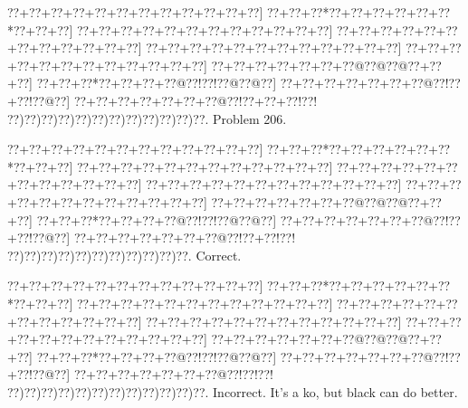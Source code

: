 \documentclass[a5paper]{article}
\begin{document}
\newpage
\begin{center}
{\goo
\0??+\0??+\0??+\0??+\0??+\0??+\0??+\0??+\0??+\0??+\0??+\0??]
\0??+\0??+\0??*\0??+\0??+\0??+\0??+\0??+\0??*\0??+\0??+\0??]
\0??+\0??+\0??+\0??+\0??+\0??+\0??+\0??+\0??+\0??+\0??+\0??]
\0??+\0??+\0??+\0??+\0??+\0??+\0??+\0??+\0??+\0??+\0??+\0??]
\0??+\0??+\0??+\0??+\0??+\0??+\0??+\0??+\0??+\0??+\0??+\0??]
\0??+\0??+\0??+\0??+\0??+\0??+\0??+\0??+\0??+\0??+\0??+\0??]
\0??+\0??+\0??+\0??+\0??+\0??+\0??@\0??@\0??@\0??+\0??+\0??]
\0??+\0??+\0??*\0??+\0??+\0??+\0??@\0??!\0??!\0??@\0??@\0??]
\0??+\0??+\0??+\0??+\0??+\0??+\0??@\0??!\0??+\0??!\0??@\0??]
\0??+\0??+\0??+\0??+\0??+\0??+\0??@\0??!\0??+\0??+\0??!\0??!
\0??)\0??)\0??)\0??)\0??)\0??)\0??)\0??)\0??)\0??)\0??)\0??.
}
Problem 206.

\end{center}
\begin{center}
{\goo
\0??+\0??+\0??+\0??+\0??+\0??+\0??+\0??+\0??+\0??+\0??+\0??]
\0??+\0??+\0??*\0??+\0??+\0??+\0??+\0??+\0??*\0??+\0??+\0??]
\0??+\0??+\0??+\0??+\0??+\0??+\0??+\0??+\0??+\0??+\0??+\0??]
\0??+\0??+\0??+\0??+\0??+\0??+\0??+\0??+\0??+\0??+\0??+\0??]
\0??+\0??+\0??+\0??+\0??+\0??+\0??+\0??+\0??+\0??+\0??+\0??]
\0??+\0??+\0??+\0??+\0??+\0??+\0??+\0??+\0??+\0??+\0??+\0??]
\0??+\0??+\0??+\0??+\0??+\0??+\0??@\0??@\0??@\0??+\0??+\0??]
\0??+\0??+\0??*\0??+\0??+\0??+\0??@\0??!\0??!\0??@\0??@\0??]
\0??+\0??+\0??+\0??+\0??+\0??+\0??@\0??!\0??+\0??!\0??@\0??]
\0??+\0??+\0??+\0??+\0??+\0??+\0??@\0??!\0??+\0??!\0??!
\0??)\0??)\0??)\0??)\0??)\0??)\0??)\0??)\0??)\0??)\0??.
}
Correct. 

\end{center}
\begin{center}
{\goo
\0??+\0??+\0??+\0??+\0??+\0??+\0??+\0??+\0??+\0??+\0??+\0??]
\0??+\0??+\0??*\0??+\0??+\0??+\0??+\0??+\0??*\0??+\0??+\0??]
\0??+\0??+\0??+\0??+\0??+\0??+\0??+\0??+\0??+\0??+\0??+\0??]
\0??+\0??+\0??+\0??+\0??+\0??+\0??+\0??+\0??+\0??+\0??+\0??]
\0??+\0??+\0??+\0??+\0??+\0??+\0??+\0??+\0??+\0??+\0??+\0??]
\0??+\0??+\0??+\0??+\0??+\0??+\0??+\0??+\0??+\0??+\0??+\0??]
\0??+\0??+\0??+\0??+\0??+\0??+\0??@\0??@\0??@\0??+\0??+\0??]
\0??+\0??+\0??*\0??+\0??+\0??+\0??@\0??!\0??!\0??@\0??@\0??]
\0??+\0??+\0??+\0??+\0??+\0??+\0??@\0??!\0??+\0??!\0??@\0??]
\0??+\0??+\0??+\0??+\0??+\0??+\0??@\0??!\0??!\0??!
\0??)\0??)\0??)\0??)\0??)\0??)\0??)\0??)\0??)\0??)\0??)\0??.
}
Incorrect. It's a ko, but black can do better. 

\end{center}
\newpage
\end{document}
